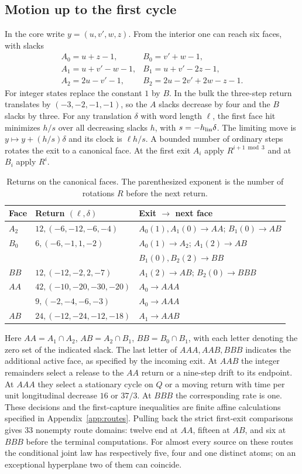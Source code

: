 \documentclass[11pt,reqno]{amsart}
\begin{document}
\subsection{Motion up to the first cycle}
In the core write $y=(u,v',w,z)$. From the interior one can reach six faces, with slacks
\[
\begin{array}{ll}
 A_0=u+z-1,&B_0=v'+w-1,\\
 A_1=u+v'-w-1,&B_1=u+v'-2z-1,\\
 A_2=2u-v'-1,&B_2=2u-2v'+2w-z-1 .
\end{array}
\]
For integer states replace the constant $1$ by $B$. In the bulk the
three-step return translates by $(-3,-2,-1,-1)$, so the $A$ slacks
decrease by four and the $B$ slacks by three. For any translation
$\delta$ with word length $\ell$, the first face hit minimizes $h/s$ over
all decreasing slacks $h$, with $s=-h_{\rm lin}\delta$. The limiting move
is $y\mapsto y+(h/s)\delta$ and its clock is $\ell h/s$. A bounded number
of ordinary steps rotates the exit to a canonical face. At the first
exit $A_i$ apply $R^{i+1\bmod3}$ and at $B_i$ apply $R^i$.

\begin{table}[ht]
\centering\small
\caption{Returns on the canonical faces. The parenthesized exponent is the
number of rotations $R$ before the next return.}\label{tab:routes}
\begin{tabular}{@{}lll@{}}
\toprule
Face & Return $(\ell,\delta)$ & Exit $\longrightarrow$ next face\\
\midrule
$A_2$ & $12,(-6,-12,-6,-4)$ & $A_0(1),A_1(0)\to AA$; $B_1(0)\to AB$\\
$B_0$ & $6,(-6,-1,1,-2)$ & $A_0(1)\to A_2$; $A_1(2)\to AB$\\
      & & $B_1(0),B_2(2)\to BB$\\
$BB$ & $12,(-12,-2,2,-7)$ & $A_1(2)\to AB$; $B_2(0)\to BBB$\\
$AA$ & $42,(-10,-20,-30,-20)$ & $A_0\to AAA$\\
     & $9,(-2,-4,-6,-3)$ & $A_0\to AAA$\\
$AB$ & $24,(-12,-24,-12,-18)$ & $A_1\to AAB$\\
\bottomrule
\end{tabular}
\end{table}
Here $AA=A_1\cap A_2$, $AB=A_2\cap B_1$, $BB=B_0\cap B_1$, with each
letter denoting the zero set of the indicated slack. The last letter of
$AAA,AAB,BBB$ indicates the additional active face, as specified by the
incoming exit. At $AAB$ the integer remainders select a release to the
$AA$ return or a nine-step drift to its endpoint. At $AAA$ they select a
stationary cycle on $Q$ or a moving return with time per unit longitudinal
decrease $16$ or $37/3$. At $BBB$ the corresponding rate is one.
These decisions and the first-capture inequalities are finite affine
calculations specified in Appendix~\ref{app:routes}.
Pulling back the strict first-exit comparisons gives 33 nonempty route
domains: twelve end at $AA$, fifteen at $AB$, and six at $BBB$ before the
terminal computations. For almost every source on these routes the
conditional joint law has respectively five, four and one distinct atoms; on an
exceptional hyperplane two of them can coincide.
\end{document}
